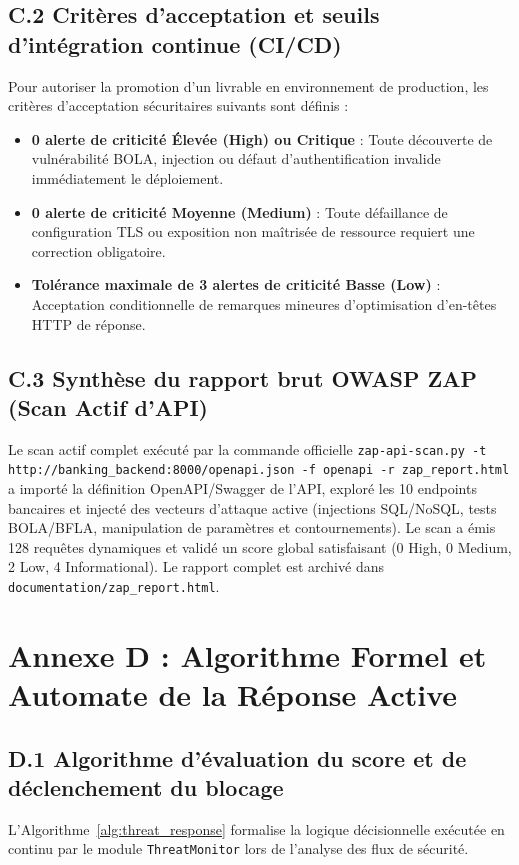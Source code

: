 \subsection*{C.2 Critères d'acceptation et seuils d'intégration continue (CI/CD)}
Pour autoriser la promotion d'un livrable en environnement de production, les critères d'acceptation sécuritaires suivants sont définis :
\begin{itemize}[leftmargin=*]
    \item \textbf{0 alerte de criticité Élevée (High) ou Critique} : Toute découverte de vulnérabilité BOLA, injection ou défaut d'authentification invalide immédiatement le déploiement.
    \item \textbf{0 alerte de criticité Moyenne (Medium)} : Toute défaillance de configuration TLS ou exposition non maîtrisée de ressource requiert une correction obligatoire.
    \item \textbf{Tolérance maximale de 3 alertes de criticité Basse (Low)} : Acceptation conditionnelle de remarques mineures d'optimisation d'en-têtes HTTP de réponse.
\end{itemize}

\subsection*{C.3 Synthèse du rapport brut OWASP ZAP (Scan Actif d'API)}
Le scan actif complet exécuté par la commande officielle \texttt{zap-api-scan.py -t http://banking\_backend:8000/openapi.json -f openapi -r zap\_report.html} a importé la définition OpenAPI/Swagger de l'API, exploré les 10 endpoints bancaires et injecté des vecteurs d'attaque active (injections SQL/NoSQL, tests BOLA/BFLA, manipulation de paramètres et contournements). Le scan a émis 128 requêtes dynamiques et validé un score global satisfaisant (0 High, 0 Medium, 2 Low, 4 Informational). Le rapport complet est archivé dans \texttt{documentation/zap\_report.html}.

\clearpage
\section*{Annexe D : Algorithme Formel et Automate de la Réponse Active}

\subsection*{D.1 Algorithme d'évaluation du score et de déclenchement du blocage}
L'Algorithme~\ref{alg:threat_response} formalise la logique décisionnelle exécutée en continu par le module \texttt{ThreatMonitor} lors de l'analyse des flux de sécurité.

